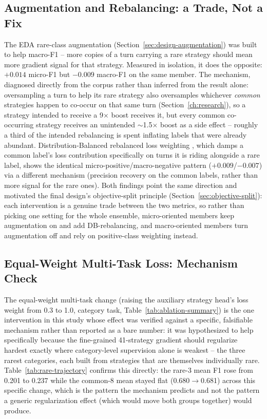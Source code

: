 \subsection{Augmentation and Rebalancing: a Trade, Not a Fix}
\label{sec:ablation-augmentation}

The EDA rare-class augmentation (Section~\ref{sec:design-augmentation}) was
built to help macro-F1 -- more copies of a turn carrying a rare strategy
should mean more gradient signal for that strategy. Measured in isolation,
it does the opposite: $+0.014$ micro-F1 but $-0.009$ macro-F1 on the same
member. The mechanism, diagnosed directly from the corpus rather than
inferred from the result alone: oversampling a turn to help its rare
strategy also oversamples whichever \emph{common} strategies happen to
co-occur on that same turn (Section~\ref{ch:research}), so a strategy
intended to receive a 9$\times$ boost receives it, but every common
co-occurring strategy receives an unintended $\sim$1.5$\times$ boost as a
side effect -- roughly a third of the intended rebalancing is spent
inflating labels that were already abundant. Distribution-Balanced
rebalanced loss weighting \citep{wu2020distribution}, which damps a common
label's loss contribution specifically on turns it is riding alongside a
rare label, shows the identical micro-positive/macro-negative pattern
($+0.009$/$-0.007$) via a different mechanism (precision recovery on the
common labels, rather than more signal for the rare ones). Both findings
point the same direction and motivated the final design's objective-split
principle (Section~\ref{sec:objective-split}): each intervention is a
genuine trade between the two metrics, so rather than picking one setting
for the whole ensemble, micro-oriented members keep augmentation on and add
DB-rebalancing, and macro-oriented members turn augmentation off and rely on
positive-class weighting instead.

\subsection{Equal-Weight Multi-Task Loss: Mechanism Check}
\label{sec:ablation-multitask}

The equal-weight multi-task change (raising the auxiliary strategy head's
loss weight from 0.3 to 1.0, category task, Table~\ref{tab:ablation-summary})
is the one intervention in this study whose effect was verified against a
specific, falsifiable mechanism rather than reported as a bare number: it
was hypothesized to help specifically because the fine-grained 41-strategy
gradient should regularize hardest exactly where category-level supervision
alone is weakest -- the three rarest categories, each built from strategies
that are themselves individually rare. Table~\ref{tab:rare-trajectory}
confirms this directly: the rare-3 mean F1 rose from 0.201 to 0.237 while
the common-8 mean stayed flat (0.680$\to$0.681) across this specific change,
which is the pattern the mechanism predicts and not the pattern a generic
regularization effect (which would move both groups together) would produce.

